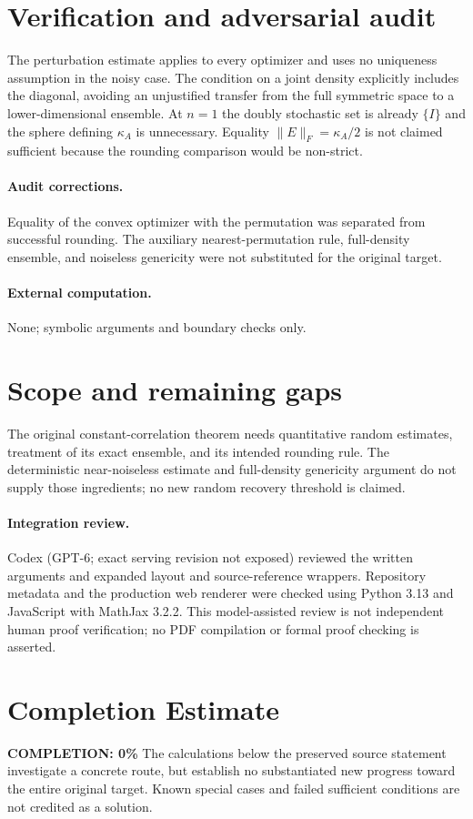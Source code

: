 \documentclass[11pt]{article}
\begin{document}
\section{Verification and adversarial audit}
The perturbation estimate applies to every optimizer and uses no uniqueness assumption in the noisy case. The condition on a joint density explicitly includes the diagonal, avoiding an unjustified transfer from the full symmetric space to a lower-dimensional ensemble. At $n=1$ the doubly stochastic set is already $\{I\}$ and the sphere defining $\kappa_A$ is unnecessary. Equality $\|E\|_F=\kappa_A/2$ is not claimed sufficient because the rounding comparison would be non-strict.
\paragraph{Audit corrections.} Equality of the convex optimizer with the permutation was separated from successful rounding. The auxiliary nearest-permutation rule, full-density ensemble, and noiseless genericity were not substituted for the original target.
\paragraph{External computation.} None; symbolic arguments and boundary checks only.
\section{Scope and remaining gaps}
The original constant-correlation theorem needs quantitative random estimates, treatment of its exact ensemble, and its intended rounding rule. The deterministic near-noiseless estimate and full-density genericity argument do not supply those ingredients; no new random recovery threshold is claimed.
\paragraph{Integration review.} Codex (GPT-6; exact serving revision not exposed) reviewed the written arguments and expanded layout and source-reference wrappers. Repository metadata and the production web renderer were checked using Python 3.13 and JavaScript with MathJax 3.2.2. This model-assisted review is not independent human proof verification; no PDF compilation or formal proof checking is asserted.

\section{Completion Estimate}
\noindent\textbf{COMPLETION: 0\%}
The calculations below the preserved source statement investigate a concrete route,
but establish no substantiated new progress toward the entire original target.
Known special cases and failed sufficient conditions are not credited as a solution.
\end{document}

